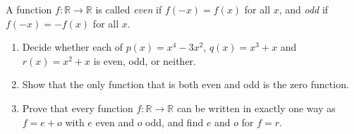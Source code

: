 A function $f:\mathbb R\to\mathbb R$ is called \emph{even} if $f(-x)=f(x)$ for all $x$, and \emph{odd} if $f(-x)=-f(x)$ for all $x$.
\begin{enumerate}
\item[(a)] Decide whether each of $p(x)=x^4-3x^2$, $q(x)=x^3+x$ and $r(x)=x^2+x$ is even, odd, or neither.
\item[(b)] Show that the only function that is both even and odd is the zero function.
\item[(c)] Prove that every function $f:\mathbb R\to\mathbb R$ can be written in exactly one way as $f=e+o$ with $e$ even and $o$ odd, and find $e$ and $o$ for $f=r$.
\end{enumerate}
